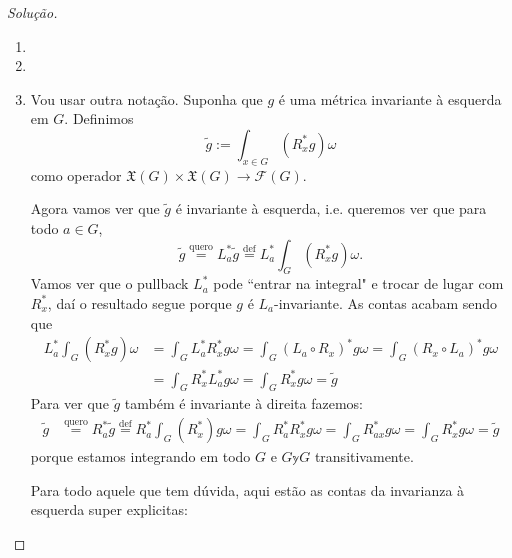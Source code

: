 \begin{proof}[Solução]\leavevmode
\begin{enumerate}[label=(\alph*)]
\item 
\item 
\item Vou usar outra notação. Suponha que \(g\) é uma métrica invariante à esquerda em \(G\). Definimos
	\[\tilde{g}:=\int_{x \in G}(R_x^*g)\omega\]
	como operador \(\mathfrak{X}(G)\times \mathfrak{X}(G) \longrightarrow \mathcal{F}(G)\).

Agora vamos ver que \(\tilde{g}\) é invariante à esquerda, i.e. queremos ver que para todo \(a \in G\),
\[\tilde{g}\overset{\text{quero}}{=}L_a^*\tilde{g}\overset{\operatorname{def}}{=}L^*_a \int_G(R_x^*g)\omega.\]
Vamos ver que o pullback \(L^*_a\) pode ``entrar na integral" e trocar de lugar com \(R^*_x\), daí o resultado segue porque \(g\) é \(L_a\)-invariante. As contas acabam sendo que
\begin{align*}
L_a ^*\int_G (R^*_xg)\omega&=\int_GL_a ^*R_x^*g \omega=\int_G (L_a \circ R_x)^*g\omega=\int_G(R_x \circ L_a)^*g\omega\\
&=\int_G R_x ^*L_a ^*g\omega=\int_GR_x^*g \omega=\tilde{g}
\end{align*}
Para ver que \(\tilde{g}\) também  é invariante à direita fazemos:
\begin{align*}
\tilde{g}&\overset{\text{quero}}{=}R_a ^*\tilde{g}\overset{\operatorname{def}}{=}R_a ^*\int_G(R_x^*)g\omega=\int_G R^* _aR_x^* g\omega=\int_G R_{ax}^*g\omega=\int_GR_x^*g\omega=\tilde{g}
\end{align*}
porque estamos integrando em todo \(G\) e \(G \mathbb{y} G\) transitivamente.

Para todo aquele que tem dúvida, aqui estão as contas da invarianza à esquerda super explicitas:


\end{enumerate}
\end{proof}
